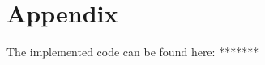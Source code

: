 \documentclass{article}
\begin{document}
\section{Appendix}

The implemented code can be found here: *******

%
%
%
%
%
%
\end{document}
